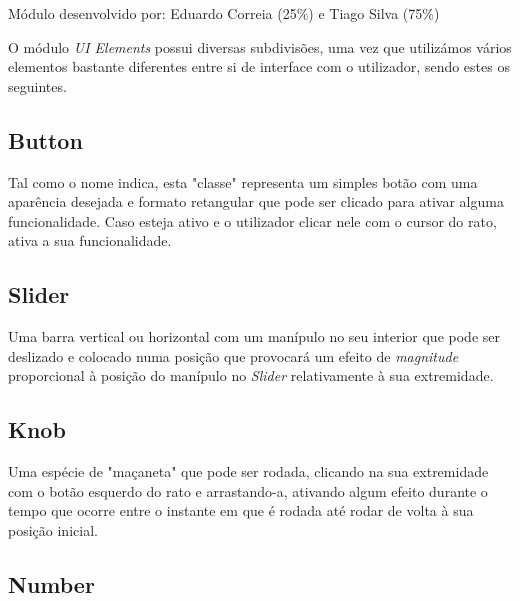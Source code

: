 \documentclass{report}
\begin{document}
Módulo desenvolvido por: Eduardo Correia (25\%) e Tiago Silva (75\%) 

O módulo \textit{UI Elements} possui diversas subdivisões, uma vez que utilizámos vários elementos bastante diferentes entre si de interface com o utilizador, sendo estes os seguintes.\footnotemark

\subsection{Button}

Tal como o nome indica, esta "classe" representa um simples botão com uma aparência desejada e formato retangular que pode ser clicado para ativar alguma funcionalidade.
Caso esteja ativo e o utilizador clicar nele com o cursor do rato, ativa a sua funcionalidade.

\subsection{Slider}

Uma barra vertical ou horizontal com um manípulo no seu interior que pode ser deslizado e colocado numa posição que provocará um efeito de \textit{magnitude} proporcional à posição do manípulo no \textit{Slider} relativamente à sua extremidade.

\subsection{Knob}

Uma espécie de "maçaneta" que pode ser rodada, clicando na sua extremidade com o botão esquerdo do rato e arrastando-a, ativando algum efeito durante o tempo que ocorre entre o instante em que é rodada até rodar de volta à sua posição inicial.


\subsection{Number}
\end{document}
